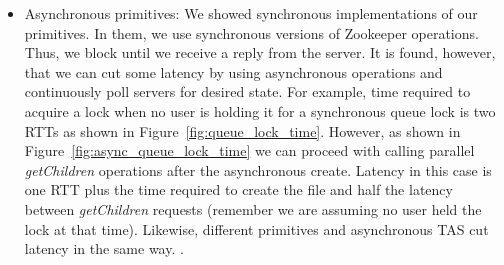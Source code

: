 \begin{itemize}
\item{Asynchronous primitives: We showed synchronous implementations of our primitives. In them, we use synchronous versions of Zookeeper operations. Thus, we block until we receive a reply from the server. It is found, however, that we can cut some latency by using asynchronous operations and continuously poll servers for desired state. For example, time required to acquire a lock when no user is holding it for a synchronous queue lock is two RTTs as shown in Figure~\ref{fig:queue_lock_time}. However, as shown in Figure~\ref{fig:async_queue_lock_time} we can proceed with calling parallel \emph{getChildren} operations after the asynchronous create. Latency in this case is one RTT plus the time required to create the file and half the latency between \emph{getChildren} requests (remember we are assuming no user held the lock at that time). Likewise, different primitives and asynchronous TAS cut latency in the same way. . }
\end{itemize}



